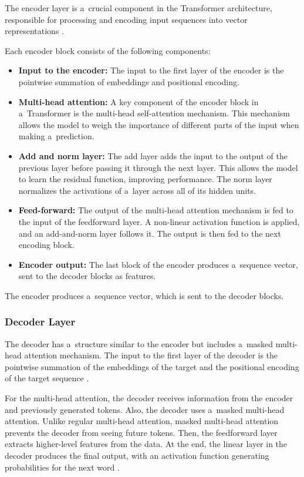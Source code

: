 The encoder layer is a~crucial component in the Transformer architecture, responsible for processing and encoding input sequences into vector representations \cite{timsina2024building}.

Each encoder block consists of the following components:
\begin{itemize}
    \item \textbf{Input to the encoder:} The input to the first layer of the encoder is the pointwise summation of embeddings and positional encoding.
    \item \textbf{Multi-head attention:} A key component of the encoder block in a~Transformer is the multi-head self-attention mechanism. This mechanism allows the model to weigh the importance of different parts of the input when making a~prediction.
    \item \textbf{Add and norm layer:} The add layer adds the input to the output of the previous layer before passing it through the next layer. This allows the model to learn the residual function, improving performance. The norm layer normalizes the activations of a~layer across all of its hidden units.
    \item \textbf{Feed-forward:} The output of the multi-head attention mechanism is fed to the input of the feedforward layer. A non-linear activation function is applied, and an add-and-norm layer follows it. The output is then fed to the next encoding block.
    \item \textbf{Encoder output:} The last block of the encoder produces a~sequence vector, sent to the decoder blocks as features.
\end{itemize}

The encoder produces a~sequence vector, which is sent to the decoder blocks.

\subsubsection*{Decoder Layer}
The decoder has a~structure similar to the encoder but includes a~masked multi-head attention mechanism. The input to the first layer of the decoder is the pointwise summation of the embeddings of the target and the positional encoding of the target sequence \cite{timsina2024building}.

For the multi-head attention, the decoder receives information from the encoder and previously generated tokens. Also, the decoder uses a~masked multi-head attention. Unlike regular multi-head attention, masked multi-head attention prevents the decoder from seeing future tokens. Then, the feedforward layer extracts higher-level features from the data. At the end, the linear layer in the decoder produces the final output, with an activation function generating probabilities for the next word \cite{timsina2024building}.

